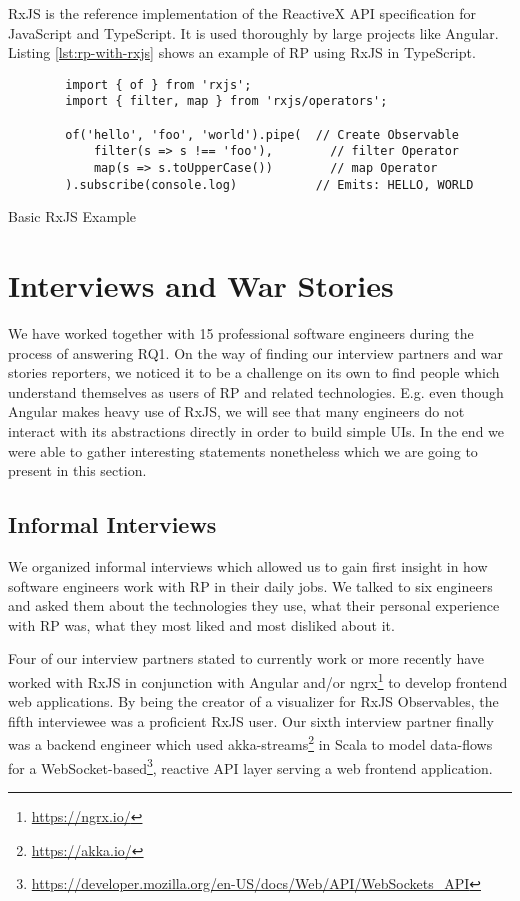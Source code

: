 \documentclass[12pt,a4paper]{article}
\begin{document}
RxJS is the reference implementation of the ReactiveX API specification for JavaScript and TypeScript. It is used thoroughly by large projects like Angular\cite{angualrrxjs}. Listing \ref{lst:rp-with-rxjs} shows an example of RP using RxJS in TypeScript.

\begin{listing}[H]
	\begin{verbatim}
		import { of } from 'rxjs';
		import { filter, map } from 'rxjs/operators';

		of('hello', 'foo', 'world').pipe(  // Create Observable
			filter(s => s !== 'foo'),        // filter Operator
			map(s => s.toUpperCase())        // map Operator
		).subscribe(console.log)           // Emits: HELLO, WORLD
	\end{verbatim}
	\caption{Basic RxJS Example}
	\label{lst:rp-with-rxjs}
\end{listing}

\section{Interviews and War Stories}
\label{sec:interviews}

We have worked together with 15 professional software engineers during the process of answering RQ1. On the way of finding our interview partners and war stories reporters, we noticed it to be a challenge on its own to find people which understand themselves as users of RP and related technologies. E.g. even though Angular makes heavy use of RxJS, we will see that many engineers do not interact with its abstractions directly in order to build simple UIs. In the end we were able to gather interesting statements nonetheless which we are going to present in this section.

\subsection{Informal Interviews}

We organized informal interviews which allowed us to gain first insight in how software engineers work with RP in their daily jobs. We talked to six engineers and asked them about the technologies they use, what their personal experience with RP was, what they most liked and most disliked about it.

Four of our interview partners stated to currently work or more recently have worked with RxJS in conjunction with Angular and/or ngrx\footnote{\url{https://ngrx.io/}} to develop frontend web applications. By being the creator of a visualizer for RxJS Observables, the fifth interviewee was a proficient RxJS user. Our sixth interview partner finally was a backend engineer which used akka-streams\footnote{\url{https://akka.io/}} in Scala to model data-flows for a WebSocket-based\footnote{\url{https://developer.mozilla.org/en-US/docs/Web/API/WebSockets_API}}, reactive API layer serving a web frontend application.
\end{document}
